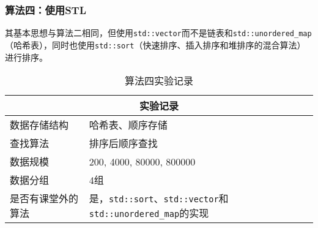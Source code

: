 \documentclass{article}
\begin{document}
\subsubsection{算法四：使用STL}
其基本思想与算法二相同，但使用\texttt{std::vector}而不是链表和\texttt{std::unordered\_map}（哈希表），同时也使用\texttt{std::sort}（快速排序、插入排序和堆排序的混合算法）进行排序。
\begin{table}[H]
    \centering
    \begin{tabular}{|p{4cm}<{\centering}|p{12cm}<{\centering}|}
        \hline
        \multicolumn{2}{|c|}{实验记录}                                                                        \\
        \hline
        数据存储结构       & 哈希表、顺序存储                                                                 \\
        \hline
        查找算法           & 排序后顺序查找                                                                   \\
        \hline
        数据规模           & 200, 4000, 80000, 800000                                                         \\
        \hline
        数据分组           & 4组                                                                              \\
        \hline
        是否有课堂外的算法 & 是，\texttt{std::sort}、\texttt{std::vector}和\texttt{std::unordered\_map}的实现 \\
        \hline
    \end{tabular}
    \caption{算法四实验记录}
\end{table}
\end{document}
